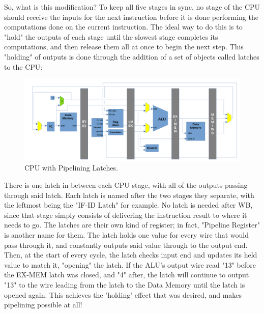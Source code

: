 \documentclass[12pt,twoside]{reedthesis}
\begin{document}
So, what is this modification?
To keep all five stages in sync, no stage of the CPU should receive the inputs for the next instruction before it is done performing the computations done on the current instruction.
The ideal way to do this is to "hold" the outputs of each stage until the slowest stage completes its computations, and then release them all at once to begin the next step. This "holding" of outputs is done through the addition of a set of objects called latches to the CPU:

\begin{figure}[h!]

	\centering
	\includegraphics[scale=0.4]{cpu_latches}
	\caption{CPU with Pipelining Latches.}
	\label{cpu-latches}
\end{figure}

There is one latch in-between each CPU stage, with all of the outputs passing through said latch. Each latch is named after the two stages they separate, with the leftmost being the "IF-ID Latch" for example. No latch is needed after WB, since that stage simply consists of delivering the instruction result to where it needs to go.
The latches are their own kind of register; in fact, "Pipeline Register" is another name for them. The latch holds one value for every wire that would pass through it, and constantly outputs said value through to the output end. Then, at the start of every cycle, the latch checks input end and updates its held value to match it, "opening" the latch. If the ALU's output wire read "13" before the EX-MEM latch was closed, and "4" after, the latch will continue to output "13" to the wire leading from the latch to the Data Memory until the latch is opened again. This achieves the 'holding' effect that was desired, and makes pipelining possible at all!%
\end{document}
